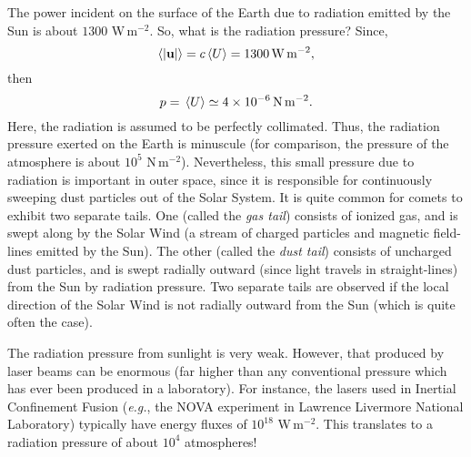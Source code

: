 The power incident on the surface of the Earth due to radiation emitted by
the Sun is about $1300$ W\,m$^{-2}$. So, what is the radiation pressure?
Since,
\begin{equation}
\langle |{\bf u}|\rangle = c\, \langle U\rangle = 1300 \,{\rm W\, m^{-2}},
\end{equation}
then
\begin{equation}
p =\, \langle U\rangle \simeq 4\times 10^{-6}\,{\rm N\, m^{-2}}.
\end{equation}
Here, the radiation is assumed to be perfectly collimated. 
Thus, the radiation pressure exerted on the Earth is minuscule (for comparison, the pressure of the atmosphere 
is  about $10^5$ N\,m$^{-2}$). Nevertheless, this small pressure due to
radiation is important in outer space, since it 
is responsible for continuously sweeping
dust particles out of the Solar System. It is quite common for comets to exhibit
two separate tails. One (called the {\em gas tail}) consists of ionized gas, and is
swept along by the Solar Wind (a stream of charged particles and magnetic field-lines
emitted by the Sun). The other (called the {\em dust tail}) consists of uncharged
dust particles, and is swept radially outward (since light travels in straight-lines) from the Sun by radiation pressure.
Two separate 
tails are observed if  the local direction of the Solar Wind is not radially
outward from the Sun (which is quite often the case). 

The radiation pressure from sunlight is very weak. However, that produced by
laser beams can be enormous (far higher than any conventional pressure which
has ever been produced in a laboratory). For instance, the lasers used in Inertial
Confinement Fusion ({\em e.g.}, the NOVA experiment in
Lawrence Livermore National Laboratory) 
typically have energy fluxes of $10^{18}$ W\,m$^{-2}$. 
This translates to a radiation pressure of about $10^4$ atmospheres!

